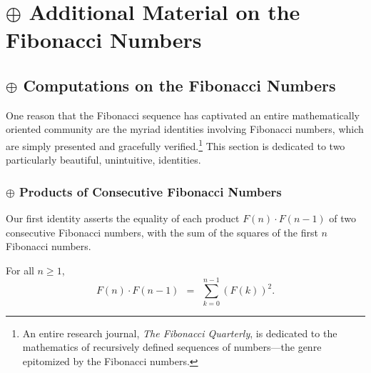 
\chapter{$\oplus$ Additional Material on the Fibonacci Numbers}
\label{ch:FIBO-enrich}

\section{$\oplus$ Computations on the Fibonacci Numbers}

One reason that the Fibonacci sequence has captivated an entire mathematically oriented community are the myriad identities involving Fibonacci numbers, which are simply presented and gracefully verified.\footnote{An entire research journal, {\it The Fibonacci Quarterly}, is dedicated to the mathematics of recursively defined sequences of numbers---the genre epitomized by the Fibonacci numbers.}  This section is dedicated to two particularly beautiful,  unintuitive, identities.

\subsection{$\oplus$ Products of Consecutive Fibonacci Numbers}
\label{sec:product-Fn-Fn+1}

Our first identity asserts the equality of each product $F(n) \cdot F(n-1)$ of two consecutive Fibonacci numbers, with the sum of the squares of the first $n$ Fibonacci numbers.

\begin{prop} 
\label{thm:FiboSumConsecutive}
For all $n \geq 1$,
\begin{equation}
\label{eq:FiboSumConsecutive}
F(n) \cdot F(n-1) \ \ = \ \ \sum_{k=0}^{n-1} (F(k))^2.
\end{equation}
\end{prop}

